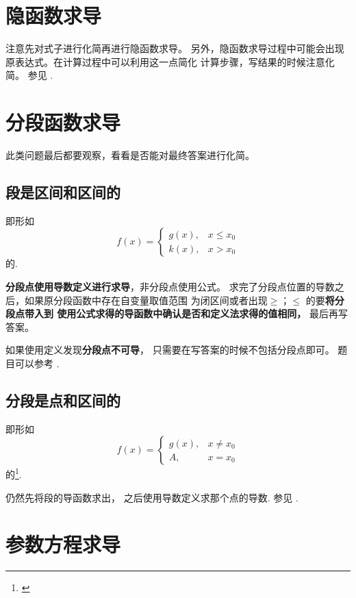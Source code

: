 \section{隐函数求导}

注意先对式子进行化简再进行隐函数求导。
另外，隐函数求导过程中可能会出现原表达式。在计算过程中可以利用这一点简化
计算步骤，写结果的时候注意化简。
参见 \cite[quest35]{w660}.

\section{分段函数求导}

此类问题最后都要观察，看看是否能对最终答案进行化简。

\subsection{段是区间和区间的}

即形如
\[
    f(x) = 
    \left\{
        \begin{array}{rl}
            g(x), &x \leq x_0 \\
            k(x), &x > x_0
        \end{array}
    \right. 
\]
的.

\textbf{分段点使用导数定义进行求导}，非分段点使用公式。
求完了分段点位置的导数之后，如果原分段函数中存在自变量取值范围
为闭区间或者出现$\geq$；$\leq$ 的要\textbf{将分段点带入到
使用公式求得的导函数中确认是否和定义法求得的值相同，}
最后再写答案。

如果使用定义发现\textbf{分段点不可导}，
只需要在写答案的时候不包括分段点即可。
题目可以参考 \cite[quest26]{w660}.

\subsection{分段是点和区间的}

即形如
\[
    f(x) = 
    \left\{
        \begin{array}{rl}
            g(x),&x \neq x_0 \\
            A, &x = x_0
        \end{array}
    \right. 
\]
的\footnote{\cite[page 16]{w660ans}}.

仍然先将段的导函数求出，
之后使用导数定义求那个点的导数.
参见 \cite[quest27]{w660}.

\section{参数方程求导}


